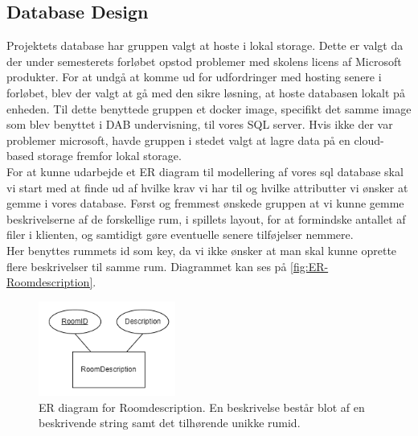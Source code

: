 \subsection{Database Design}
\label{ssec:DB Design}

Projektets database har gruppen valgt at hoste i lokal storage. Dette er valgt da der under semesterets forløbet opstod problemer med skolens licens af Microsoft produkter. For at undgå at komme ud for udfordringer med hosting senere i forløbet, blev der valgt at gå med den sikre løsning, at hoste databasen lokalt på enheden. Til dette benyttede gruppen et docker image\cite{SQL server with docker}, specifikt det samme image som blev benyttet i DAB undervisning, til vores SQL server.
Hvis ikke der var problemer microsoft, havde gruppen i stedet valgt at lagre data på en cloud-based storage fremfor lokal storage.\\

For at kunne udarbejde et ER diagram til modellering af vores sql database skal vi start med at finde ud af hvilke krav vi har til og hvilke attributter vi ønsker at gemme i vores database.
Først og fremmest ønskede gruppen at vi kunne gemme beskrivelserne af de forskellige rum, i spillets layout, for at formindske antallet af filer i klienten, og samtidigt gøre eventuelle senere tilføjelser nemmere.\\ 
Her benyttes rummets id som key, da vi ikke ønsker at man skal kunne oprette flere beskrivelser til samme rum. Diagrammet kan ses på \autoref{fig:ER-Roomdescription}.

\begin{figure}[H]
\centering
\includegraphics[width = 0.4\textwidth]{02-Body/Images/ER-RoomDescription.PNG}
\caption{ER diagram for Roomdescription. En beskrivelse består blot af en beskrivende string samt det tilhørende unikke rumid.}
\label{fig:ER-Roomdescription}
\end{figure}


